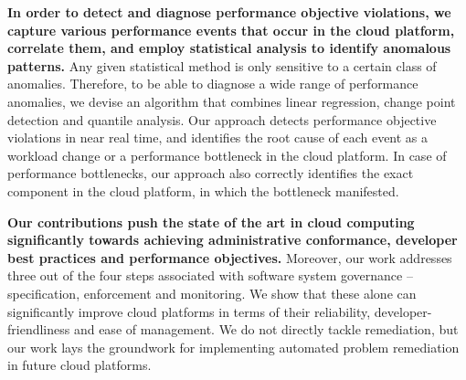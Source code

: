\textbf{In order to detect and diagnose performance objective violations,
we capture various performance events that occur in the cloud platform,
correlate them, and employ statistical analysis to identify anomalous patterns.} Any given statistical
method is only sensitive to a certain class of anomalies. Therefore, to be able to diagnose a wide range of
performance anomalies, we devise an algorithm that combines linear regression, change point
detection and quantile analysis. Our approach detects performance objective violations in near real time,
and identifies the root cause of each event as a workload change or a performance bottleneck
in the cloud platform. In case of performance bottlenecks, our approach also correctly identifies
the exact component in the cloud platform, in which the bottleneck manifested.

\textbf{Our contributions push the state of the art in cloud computing significantly towards achieving
administrative conformance, developer best practices and performance objectives.} Moreover,
our work addresses three out of the four steps associated with software system governance --
specification, enforcement and monitoring. We show that these alone can significantly improve cloud platforms
in terms of their reliability, developer-friendliness and ease of management. 
We do not directly tackle remediation, but our work
lays the groundwork for implementing automated problem remediation in future cloud platforms.